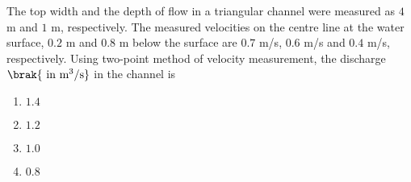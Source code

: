 \item The top width and the depth of flow in a triangular channel were measured as $4$ m and $1$ m, respectively. The measured velocities on the centre line at the water surface, $0.2$ m and $0.8$ m below the surface are $0.7$ m/s, $0.6$ m/s and $0.4$ m/s, respectively. Using two-point method of velocity measurement, the discharge $\brak{\text{ in  m}^3/\text{s}}$ in the channel is
\begin{multicols}{4}
    \begin{enumerate}
        \item $1.4$
        \item $1.2$
        \item $1.0$
        \item $0.8$
    \end{enumerate}
\end{multicols}

